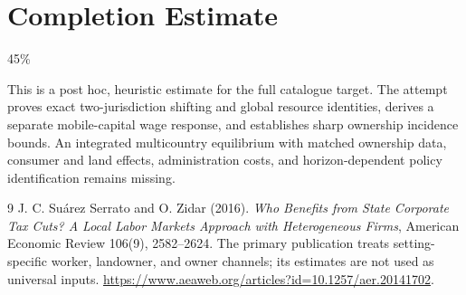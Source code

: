 \documentclass[11pt,a4paper]{article}
\begin{document}
\section{Completion Estimate}
45\%

This is a post hoc, heuristic estimate for the full catalogue target.
The attempt proves exact two-jurisdiction shifting and global resource identities, derives a separate mobile-capital wage response, and establishes sharp ownership incidence bounds. An integrated multicountry equilibrium with matched ownership data, consumer and land effects, administration costs, and horizon-dependent policy identification remains missing.

\begin{thebibliography}{9}
 J. C. Su\'arez Serrato and O. Zidar (2016).
\emph{Who Benefits from State Corporate Tax Cuts? A Local Labor Markets Approach with Heterogeneous Firms}, American Economic Review 106(9), 2582--2624.
The primary publication treats setting-specific worker, landowner, and owner channels; its estimates are not used as universal inputs.
\url{https://www.aeaweb.org/articles?id=10.1257/aer.20141702}.
\end{thebibliography}
\end{document}
